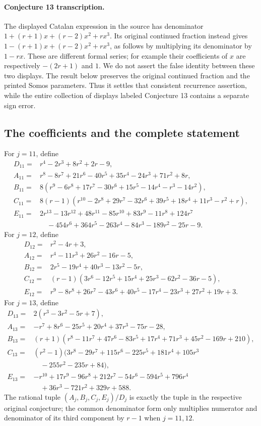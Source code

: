 \documentclass[11pt,a4paper]{article}
\theoremstyle{definition}
\theoremstyle{remark}
\begin{document}
\paragraph{Conjecture 13 transcription.}
The displayed Catalan expression in the source has denominator
$1+(r+1)x+(r-2)x^2+rx^3$. Its original continued fraction instead gives
$1-(r+1)x+(r-2)x^2+rx^3$, as follows by multiplying its denominator by
$1-rx$. These are different formal series; for example their coefficients
of $x$ are respectively $-(2r+1)$ and $1$. We do not assert the false
identity between these two displays. The result below preserves the
original continued fraction and the printed Somos parameters. Thus it
settles that consistent recurrence assertion, while the entire collection
of displays labeled Conjecture 13 contains a separate sign error.

\subsection{The coefficients and the complete statement}
For $j=11$, define
\begin{align*}
 D_{11}={}&r^4-2r^3+8r^2+2r-9,\\
 A_{11}={}&r^8-8r^7+21r^6-40r^5+35r^4-24r^3+71r^2+8r,\\
 B_{11}={}&8(r^9-6r^8+17r^7-30r^6+15r^5-14r^4-r^3-14r^2),\\
 C_{11}={}&8(r-1)(r^{10}-2r^8+29r^7-32r^6+39r^5+18r^4+11r^3-r^2+r),\\
 E_{11}={}&2r^{13}-13r^{12}+48r^{11}-85r^{10}+83r^9-11r^8+124r^7\\
 &\quad-454r^6+364r^5-263r^4-84r^3-189r^2-25r-9.
\end{align*}
For $j=12$, define
\begin{align*}
 D_{12}={}&r^2-4r+3,\\
 A_{12}={}&r^4-11r^3+26r^2-16r-5,\\
 B_{12}={}&2r^5-19r^4+40r^3-13r^2-5r,\\
 C_{12}={}&(r-1)(3r^6-12r^5+15r^4+25r^3-62r^2-36r-5),\\
 E_{12}={}&r^9-8r^8+26r^7-43r^6+40r^5-17r^4-23r^3+27r^2+19r+3.
\end{align*}
For $j=13$, define
\begin{align*}
 D_{13}={}&2(r^3-3r^2-5r+7),\\
 A_{13}={}&-r^7+8r^6-25r^5+20r^4+37r^3-75r-28,\\
 B_{13}={}&(r+1)(r^8-11r^7+47r^6-83r^5+17r^4+71r^3+45r^2-169r+210),\\
 C_{13}={}&(r^2-1)(3r^8-29r^7+115r^6-225r^5+181r^4+105r^3\\
 &\quad-255r^2-235r+84),\\
 E_{13}={}&-r^{10}+17r^9-96r^8+212r^7-54r^6-594r^5+796r^4\\
 &\quad+36r^3-721r^2+329r+588.
\end{align*}
The rational tuple
$(A_j,B_j,C_j,E_j)/D_j$ is exactly the tuple in the respective original
conjecture; the common denominator form only multiplies numerator and
denominator of its third component by $r-1$ when $j=11,12$.
\end{document}
